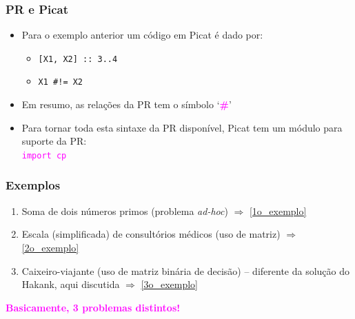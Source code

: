 \begin{frame}[fragile]
\frametitle{PR e Picat}

\begin{block}{}

\begin{itemize}
    \item Para o exemplo anterior um  código em Picat é dado por:
      \pause
    \begin{itemize}
        \item \texttt{[X1, X2] :: 3..4}
        \item \texttt{X1 \#!= X2} 
     \end{itemize}  
      
      \pause
     \item Em resumo, as relações da PR tem o símbolo `\textbf{\textcolor{magenta}{{\#}}}' 

  \pause
  \item Para tornar toda esta sintaxe da PR disponível, Picat 
        tem um módulo para suporte da PR:\\
         \textcolor{magenta}{\texttt{import cp}}
    
\end{itemize}

\end{block}
    
\end{frame}

\begin{frame}[fragile] 

\frametitle{Exemplos}

\label{3_exemplos}
\begin{block}{}
\begin{enumerate}
  \item Soma de dois números primos (problema \textit{ad-hoc})
  $\Rightarrow $ \ref{1o_exemplo}
  
  
  \pause
  \item Escala (simplificada) de consultórios médicos (uso de
  matriz)   $\Rightarrow $ \ref{2o_exemplo}
    
  \pause
  \item Caixeiro-viajante (uso de matriz binária de decisão) -- diferente
  da solução do Hakank, aqui discutida $\Rightarrow $ \ref{3o_exemplo}
      
\end{enumerate}
\end{block}

  \begin{center}
  \textbf{\textcolor{magenta}{Basicamente, 3 problemas distintos!}}
  \end{center}

\end{frame}

